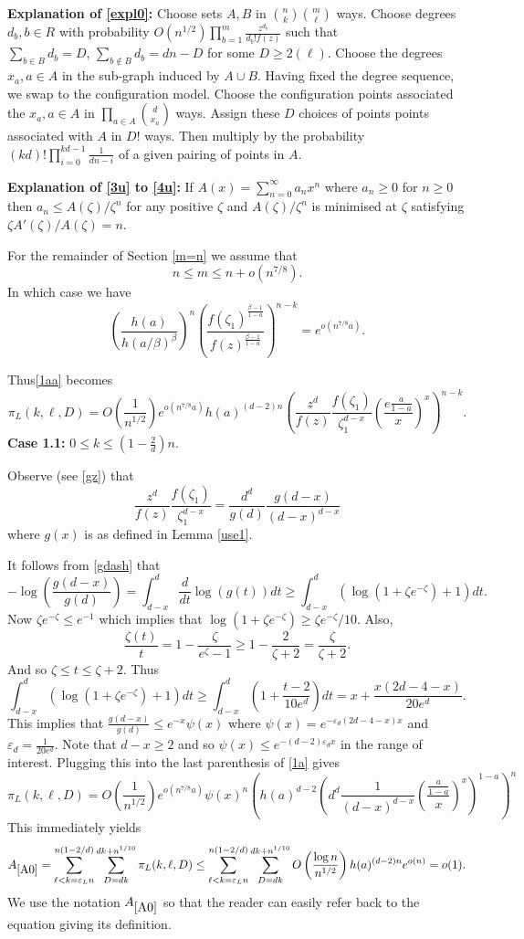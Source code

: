 \documentclass[11pt]{article}
\def\b{\beta}
\def\e{\varepsilon}
\def\z{\zeta}
\def\p{\pi}
\newcommand{\brac}[1]{\left(#1\right)}
\newcommand{\bfrac}[2]{\brac{\frac{#1}{#2}}}
\newcommand{\beq}[1]{\begin{equation}\label{#1}}
\newcommand{\eeq}{\end{equation}}
\begin{document}
{\bf Explanation of \eqref{expl0}:}
Choose sets $A,B$ in  $\binom{n}{k}\binom{m}{\ell}$ ways. Choose degrees $d_b, b\in R$ with probability 
$O(n^{1/2})\prod_{b=1}^m\frac{z^{d_b}}{d_b!f(z)}$ such that $\sum_{b\in B}d_b=D,\,\sum_{b\notin B}d_b=dn-D$ for some $D\geq 2(\ell)$.
Choose the degrees $x_a,a\in A$ in the sub-graph induced by $A\cup B$. Having fixed the degree sequence,
we swap to the configuration model. Choose the configuration points associated
the $x_a,a\in A$ in $\prod_{a\in A}\binom{d}{x_a}$ ways. Assign these $D$ choices of points points associated with $A$ in $D!$ ways.
Then multiply by the probability $(kd)!\prod_{i=0}^{kd-1}\frac{1}{dn-i}$ of a given pairing of points in $A$.

{\bf Explanation of \eqref{3u} to \eqref{4u}:} If $A(x)=\sum_{n=0}^\infty a_nx^n$ where $a_n\geq 0$ for $n\geq 0$ 
then $a_n\leq A(\z)/\z^n$ for any positive $\z$ and $A(\z)/\z^n$ is minimised at $\z$ satisfying 
$\z A'(\z)/A(\z)=n$.



For the remainder of Section \ref{m=n} we assume that 
\beq{46a}
n\leq m\leq n+o(n^{7/8}).
\eeq
In which case we have
$$\bfrac{h(a)}{h(a/\b)^{\b}}^n\bfrac{f(\z_1)^{\frac{\b-1}{1-a}}}{f(z)^{\frac{\b-1}{1-a}}}^{n-k}=e^{o(n^{7/8}a)}.$$

Thus\eqref{1aa} becomes
\beq{1a}
\p_L(k,\ell,D)=O\bfrac{1}{n^{1/2}}e^{o(n^{7/8}a)}h(a)^{(d-2)n}
\brac{\frac{z^d}{f(z)}\frac{f(\z_1)}{\z_1^{d-x}}
\bfrac{e\frac{a}{1-a}}{x}^x}^{n-k}.
\eeq
{\bf Case 1.1:} $0\leq k\leq \brac{1-\frac{2}{d}}n$.

Observe (see \eqref{gz}) that
$$
\frac{z^d}{f(z)}\frac{f(\z_1)}{\z_1^{d-x}} = \frac{d^d}{g(d)}\frac{g(d-x)}{(d-x)^{d-x}}
$$
where $g(x)$ is as defined in Lemma \ref{use1}.

It follows from \eqref{gdash} that
\beq{int}
-\log\bfrac{g(d-x)}{g(d)} = \int_{d-x}^d\frac{d}{dt}\log(g(t))dt \ge \int_{d-x}^d(\log(1+\z e^{-\z})+1)dt.
\eeq
Now $\z e^{-\z}\leq e^{-1}$ which implies that $\log(1+\z e^{-\z})\geq \z e^{-\z}/10$. Also,
$$\frac{\z(t)}{t}=1-\frac{\z}{e^\z-1}\geq 1-\frac{2}{\z+2}=\frac{\z}{\z+2}.$$
And so $\z\leq t\leq \z+2$. Thus
$$\int_{d-x}^d(\log(1+\z e^{-\z})+1)dt\geq \int_{d-x}^d\brac{1+\frac{t-2}{10e^d}}dt=x+\frac{x(2d-4-x)}{20e^d}.$$
This implies that $\frac{g(d-x)}{g(d)}\le e^{-x}\psi(x)$ where $\psi(x)=e^{-\e_d(2d-4-x)x}$ and $\e_d=\frac{1}{20e^d}$. 
Note that $d-x\geq 2$ and so $\psi(x)\le e^{-(d-2)\e_dx}$ in the range of interest.
Plugging this into the last parenthesis of \eqref{1a} gives
\beq{1b}
\p_L(k,\ell,D)=O\bfrac{1}{n^{1/2}}e^{o(n^{7/8}a)}
\psi(x)^n\brac{h(a)^{d-2}\brac{d^d\frac{1}{(d-x)^{d-x}}\bfrac{\frac{a}{1-a}}{x}^x}^{1-a}}^n
\eeq
This immediately yields
\beq{A0}
A_{\ref{A0}}=\sum_{\ell<k=\e_Ln}^{n(1-2/d)}\sum_{D=dk}^{dk+n^{1/10}}
\p_L(k,\ell,D)\leq\sum_{\ell<k=\e_Ln}^{n(1-2/d)}\sum_{D=dk}^{dk+n^{1/10}}
O\bfrac{\log n}{n^{1/2}}h(a)^{(d-2)n}e^{o(n)}=o(1).
\eeq
We use the notation $A_{\ref{A0}}$ so that the reader can easily refer back to the equation giving its definition.
\end{document}
